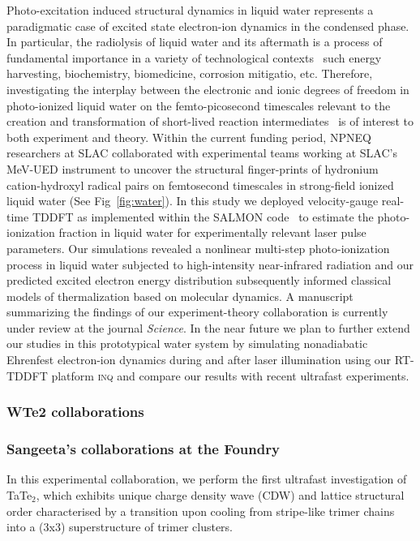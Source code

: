 Photo-excitation induced structural dynamics in liquid water represents a paradigmatic case of excited state electron-ion dynamics in the condensed phase. 
In particular, the radiolysis of liquid water and its aftermath is a process of fundamental importance in a variety of technological contexts~\cite{Garrett2005} such energy harvesting, biochemistry, biomedicine, corrosion mitigatio, etc. 
Therefore, investigating the interplay between the electronic and ionic degrees of freedom in photo-ionized liquid water on the femto-picosecond timescales relevant to the creation and transformation of short-lived reaction intermediates~\cite{Loh2020} is of interest to both experiment and theory.
Within the current funding period, NPNEQ researchers at SLAC collaborated with experimental teams working at SLAC's MeV-UED instrument to uncover the structural finger-prints of hydronium cation-hydroxyl radical pairs on femtosecond timescales in strong-field ionized liquid water (See Fig~\ref{fig:water}). 
In this study we deployed velocity-gauge real-time TDDFT as implemented within the \textsc{SALMON} code~\cite{salmon} to estimate the photo-ionization fraction in liquid water for experimentally relevant laser pulse parameters. 
Our simulations revealed a nonlinear multi-step photo-ionization process in liquid water subjected to high-intensity near-infrared radiation and our predicted excited electron energy distribution subsequently informed classical models of thermalization based on molecular dynamics. A manuscript summarizing the findings of our experiment-theory collaboration is currently under review at the journal \textit{Science}.
In the near future we plan to further extend our studies in this prototypical water system by simulating nonadiabatic Ehrenfest electron-ion dynamics during and after laser illumination using our RT-TDDFT platform \textsc{inq} and compare our results with recent ultrafast experiments. 
\subsubsection{WTe2 collaborations}

\subsubsection{Sangeeta's collaborations at the Foundry}
In this experimental collaboration, we perform the first ultrafast investigation of TaTe$_2$, which exhibits unique charge density wave (CDW) and lattice structural order characterised by a transition upon cooling from stripe-like trimer chains into a (3x3) superstructure of trimer clusters. 

